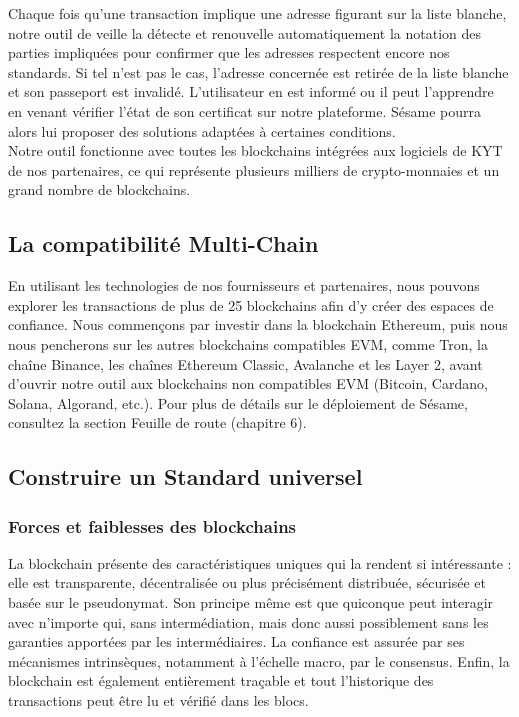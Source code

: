 ﻿\documentclass[a4paper]{article}
\begin{document}
Chaque fois qu'une transaction implique une adresse figurant sur la liste blanche, notre outil de veille la détecte et renouvelle automatiquement la notation des parties impliquées pour confirmer que les adresses respectent encore nos standards. Si tel n’est pas le cas, l’adresse concernée est retirée de la liste blanche et son passeport est invalidé. L’utilisateur en est informé ou il peut l’apprendre en venant vérifier l’état de son certificat sur notre plateforme. Sésame pourra alors lui proposer des solutions adaptées à certaines conditions. \\

Notre outil fonctionne avec toutes les blockchains intégrées aux logiciels de KYT de nos partenaires, ce qui représente plusieurs milliers de crypto-monnaies et un grand nombre de blockchains.

\subsection{La compatibilité Multi-Chain} 
En utilisant les technologies de nos fournisseurs et partenaires, nous pouvons explorer les transactions de plus de 25 blockchains afin d’y créer des espaces de confiance. Nous commençons par investir dans la blockchain Ethereum, puis nous nous pencherons sur les autres blockchains compatibles EVM, comme Tron, la chaîne Binance, les chaînes Ethereum Classic, Avalanche et les Layer 2, avant d'ouvrir notre outil aux blockchains non compatibles EVM (Bitcoin, Cardano, Solana, Algorand, etc.). Pour plus de détails sur le déploiement de Sésame, consultez la section Feuille de route (chapitre 6).

\subsection{Construire un Standard universel } 
\subsubsection{Forces et faiblesses des blockchains}
La blockchain présente des caractéristiques uniques qui la rendent si intéressante : elle est transparente, décentralisée ou plus précisément distribuée, sécurisée et basée sur le pseudonymat. Son principe même est que quiconque peut interagir avec n’importe qui, sans intermédiation, mais donc aussi possiblement sans les garanties apportées par les intermédiaires. La confiance est assurée par ses mécanismes intrinsèques, notamment à l'échelle macro, par le consensus. Enfin, la blockchain est également entièrement traçable et tout l'historique des transactions peut être lu et vérifié dans les blocs. \\
\end{document}
